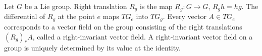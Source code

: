 Let $G$ be a Lie group. Right translation $R_g$ is the map $R_g: G \to G$, $R_g h = hg$. The differential of $R_g$ at the point $e$ maps $TG_e$ into $TG_g$. Every vector $A \in TG_e$ corresponds to a vector field on the group consisting of the right translations $(R_g)_* A$, called a right-invariant vector field. A right-invariant vector field on a group is uniquely determined by its value at the identity.
